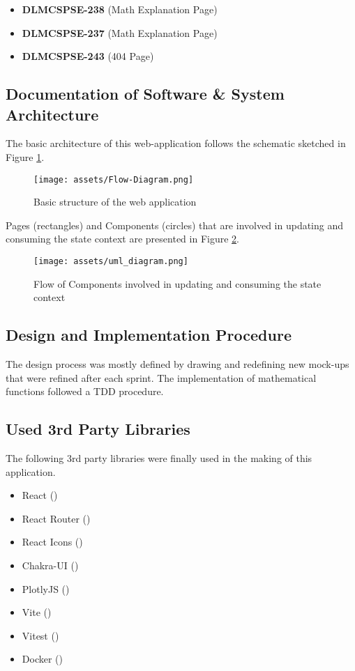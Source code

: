 \begin{itemize}
\item {\textbf{\color{TAGpurple}\ttfamily DLMCSPSE-238 }}(Math Explanation Page)
\item {\textbf{\color{TAGpurple}\ttfamily DLMCSPSE-237 }}(Math Explanation Page)
\item {\textbf{\color{TAGpurple}\ttfamily DLMCSPSE-243 }}(404 Page)
\end{itemize}

\newpage
\subsection{Documentation of Software \& System Architecture}

The basic architecture of this web-application follows the schematic sketched in Figure \ref{fig:flow_chart}.

\begin{figure}[!h]
  \centering
  \caption{Basic structure of the web application}
  \texttt{[image: assets/Flow-Diagram.png]}
  \label{fig:flow_chart}
\end{figure}

\newpage

Pages (rectangles) and Components (circles) that are involved in updating and consuming the state context are presented in Figure  \ref{fig:uml_diagram}.

\begin{figure}[!h]
  \centering
  \caption{Flow of Components involved in updating and consuming the state context}
  \texttt{[image: assets/uml\_diagram.png]}
  \label{fig:uml_diagram}
\end{figure}

\newpage
\subsection{Design and Implementation Procedure}
The design process was mostly defined by drawing and redefining new mock-ups that were refined after each sprint. The implementation of mathematical functions followed a \ac{TDD} procedure.

\subsection{Used 3rd Party Libraries}
The following 3rd party libraries were finally used in the making of this application. 
\begin{itemize}
  \item React (\cite{React})
  \item React Router (\cite{ReactRouter})
  \item React Icons (\cite{ReactIcons})
  \item Chakra-UI (\cite{chakra})
  \item PlotlyJS (\cite{PlotlyJS})
  \item Vite (\cite{Vite})
  \item Vitest (\cite{Vitest})
  \item Docker (\cite{Docker})
\end{itemize}